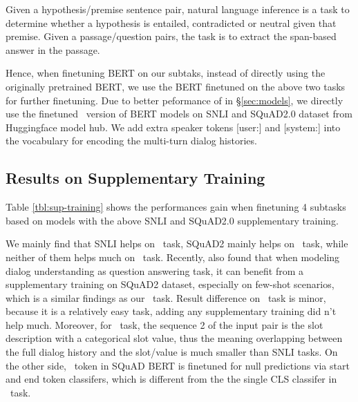  Given a hypothesis/premise
sentence pair, natural language inference is a task to determine
whether a hypothesis is entailed, contradicted or neutral given
that premise.
 Given a passage/question pairs, the
task is to extract the span-based answer in the passage.

Hence, when finetuning BERT on our subtaks, instead of directly using
the originally pretrained BERT, we use the BERT
finetuned on the above two tasks for further finetuning.  Due to better
peformance of \CE in \S\ref{sec:models}, we directly use the finetuned
\CE~version of BERT models on SNLI and SQuAD2.0 dataset from
Huggingface model hub. We add extra speaker tokens [user:] and
[system:] into the vocabulary for encoding the multi-turn dialog
histories.
%

\subsection{Results on Supplementary Training}
\label{ssec:sgd:results-secondary}
Table \ref{tbl:sup-training} shows the performances gain
when finetuning 4 subtasks based on models with the above
SNLI and SQuAD2.0 supplementary training.

We mainly find that SNLI helps on \IC~task, SQuAD2 mainly helps on
\NSL~task, while neither of them helps much on \CSL~task. Recently,
\citet{namazifar2020language} also found that when modeling dialog
understanding as question answering task, it can benefit from a
supplementary training on SQuAD2 dataset, especially on few-shot
scenarios, which is a similar findings as our \NSL~task. Result
difference on \RSI~task is minor, because it is a relatively easy
task, adding any supplementary training did n't help much. Moreover,
for \CSL~task, the sequence 2 of the input pair is the slot
description with a categorical slot value, thus the meaning overlapping between the
full dialog history and the slot/value is much smaller than SNLI
tasks. On the other side, \CLS~token in SQuAD BERT is finetuned for
null predictions via start and end token classifers, which is
different from the the single CLS classifer in \CSL~task.

